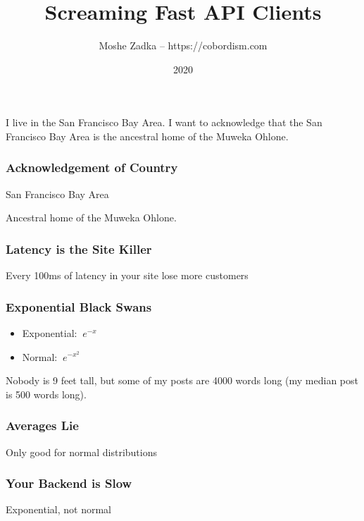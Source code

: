 \usepackage{hyperref}
\usepackage{graphicx}
\usepackage{listings}
\usepackage{textcomp}
\usepackage{fancyvrb}

\title{Screaming Fast API Clients}
\author{Moshe Zadka -- https://cobordism.com}
\date{2020}


\begin{titlepage}
\maketitle
\end{titlepage}

\frame{\titlepage}

I live in the San Francisco Bay Area.
I want to acknowledge that the San Francisco Bay Area
is the ancestral home of the Muweka Ohlone.

\begin{frame}
\frametitle{Acknowledgement of Country}

San Francisco Bay Area

Ancestral home of the Muweka Ohlone.

\end{frame}

\begin{frame}
\frametitle{Latency is the Site Killer}

Every 100ms of latency in your site lose more customers

\end{frame}

\begin{frame}
\frametitle{Exponential Black Swans}

\begin{itemize}
\item Exponential: $~e^{-x}$
\item Normal: $~e^{-x^2}$
\end{itemize}

\end{frame}

Nobody is 9 feet tall,
but some of my posts are 4000 words long
(my median post is 500 words long).

\begin{frame}
\frametitle{Averages Lie}

Only good for normal distributions

\end{frame}

\begin{frame}
\frametitle{Your Backend is Slow}

Exponential, not normal

\end{frame}

